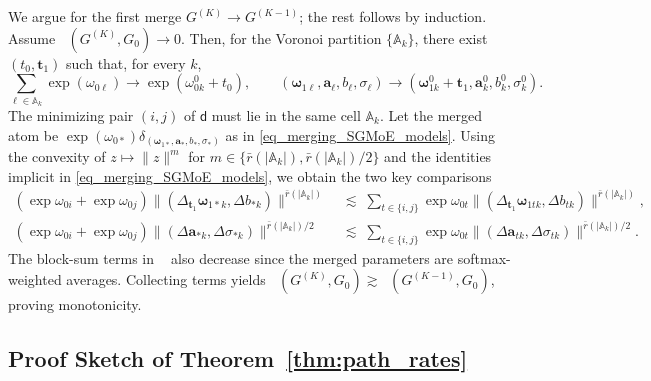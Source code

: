 \documentclass[twoside]{article}
\DeclareMathOperator*{\VDFRA}{D_{FRA}}
\newcommand{\divclus}{\mathsf{d}}
\theoremstyle{plain}
\theoremstyle{definition}
\theoremstyle{plain}
\def\vomega{{\bm{\omega}}}
\def\va{{\bm{a}}}
\def\vt{{\bm{t}}}
\def\sA{{\mathbb{A}}}
\begin{document}
We argue for the first merge \(G^{(K)}\to G^{(K-1)}\); the rest follows by induction.
Assume \(\VDFRA(G^{(K)},G_0)\to0\).
Then, for the Voronoi partition \(\{\sA_k\}\), there exist \((t_0,\vt_1)\) such that, for every \(k\),
\[
\sum_{\ell\in\sA_k}\exp(\omega_{0\ell})\to \exp(\omega_{0k}^0+t_0),\qquad
(\vomega_{1\ell},\va_\ell,b_\ell,\sigma_\ell)\to (\vomega_{1k}^0+\vt_1,\va_k^0,b_k^0,\sigma_k^0).
\]
The minimizing pair \((i,j)\) of \(\divclus\) must lie in the same cell \(\sA_k\).
Let the merged atom be \(\exp(\omega_{0*})\delta_{(\vomega_{1*},\va_*,b_*,\sigma_*)}\) as in \cref{eq_merging_SGMoE_models}.
Using the convexity of \(z\mapsto\|z\|^{m}\) for \(m\in\{\bar r(|\sA_k|),\bar r(|\sA_k|)/2\}\) and the identities implicit in \cref{eq_merging_SGMoE_models}, we obtain the two key comparisons
\begin{align*}
(\exp\omega_{0i}+\exp\omega_{0j})\|(\Delta_{\vt_1}\vomega_{1*k},\Delta b_{*k})\|^{\bar r(|\sA_k|)}
&\;\lesssim\; \sum_{t\in\{i,j\}}\exp\omega_{0t}\|(\Delta_{\vt_1}\vomega_{1tk},\Delta b_{tk})\|^{\bar r(|\sA_k|)},\\
(\exp\omega_{0i}+\exp\omega_{0j})\|(\Delta \va_{*k},\Delta \sigma_{*k})\|^{\bar r(|\sA_k|)/2}
&\;\lesssim\; \sum_{t\in\{i,j\}}\exp\omega_{0t}\|(\Delta \va_{tk},\Delta \sigma_{tk})\|^{\bar r(|\sA_k|)/2}.
\end{align*}
The block-sum terms in \(\VDFRA\) also decrease since the merged parameters are softmax-weighted averages.
Collecting terms yields
\(\VDFRA(G^{(K)},G_0)\gtrsim \VDFRA(G^{(K-1)},G_0)\), proving monotonicity.

\subsection{Proof Sketch of Theorem~\ref{thm:path_rates}}
\end{document}
